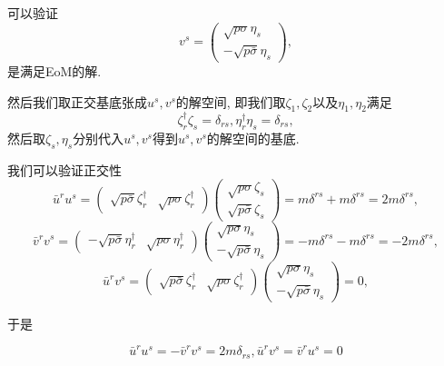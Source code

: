 可以验证
\begin{equation}
    v^s=\begin{pmatrix}
        \sqrt{p\sigma}\eta_s\\
        -\sqrt{p\bar\sigma}\eta_s
    \end{pmatrix},
\end{equation}
是满足EoM的解.

然后我们取正交基底张成$u^s, v^s$的解空间, 即我们取$\zeta_1, \zeta_2$以及$\eta_1, \eta_2$满足
\begin{equation}
    \zeta_r^\dagger\zeta_s=\delta_{rs}, \eta_r^\dagger\eta_s=\delta_{rs},
\end{equation}
然后取$\zeta_s, \eta_s$分别代入$u^s, v^s$得到$u^s, v^s$的解空间的基底.

我们可以验证正交性
\begin{equation}
    \bar u^ru^s=\begin{pmatrix}
        \sqrt{p\bar\sigma}\zeta_r^\dagger & \sqrt{p\sigma}\zeta_r^\dagger
    \end{pmatrix}\begin{pmatrix}
        \sqrt{p\sigma}\zeta_s\\
        \sqrt{p\bar\sigma}\zeta_s
    \end{pmatrix}=m\delta^{rs}+m\delta^{rs}=2m\delta^{rs},
\end{equation}
\begin{equation}
    \bar v^rv^s=\begin{pmatrix}
        -\sqrt{p\bar\sigma}\eta_r^\dagger & \sqrt{p\sigma}\eta_r^\dagger
    \end{pmatrix}\begin{pmatrix}
        \sqrt{p\sigma}\eta_s\\
        -\sqrt{p\bar\sigma}\eta_s
    \end{pmatrix}=-m\delta^{rs}-m\delta^{rs}=-2m\delta^{rs},
\end{equation}
\begin{equation}
    \bar u^rv^s=\begin{pmatrix}
        \sqrt{p\bar\sigma}\zeta_r^\dagger & \sqrt{p\sigma}\zeta_r^\dagger
    \end{pmatrix}\begin{pmatrix}
        \sqrt{p\sigma}\eta_s\\
        -\sqrt{p\bar\sigma}\eta_s
    \end{pmatrix}=0,
\end{equation}

于是
\begin{theorem}
    \begin{equation}
        \bar u^ru^s=-\bar v^rv^s=2m\delta_{rs}, \bar u^rv^s=\bar v^ru^s=0
    \end{equation}
\end{theorem}

